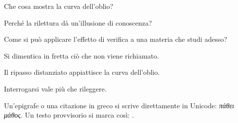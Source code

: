 \begin{domande}
  \item Che cosa mostra la curva dell'oblio?
  \item Perché la rilettura dà un'illusione di conoscenza?
  \item Come si può applicare l'effetto di verifica a una materia
        che studi adesso?
\end{domande}

\begin{sintesi}
  \item Si dimentica in fretta ciò che non viene richiamato.
  \item Il ripasso distanziato appiattisce la curva dell'oblio.
  \item Interrogarsi vale più che rileggere.
\end{sintesi}

\asterismo

Un'epigrafe o una citazione in greco si scrive direttamente in
Unicode: \emph{πάθει μάθος}. Un testo provvisorio si marca così:
.

\finecapitolo
